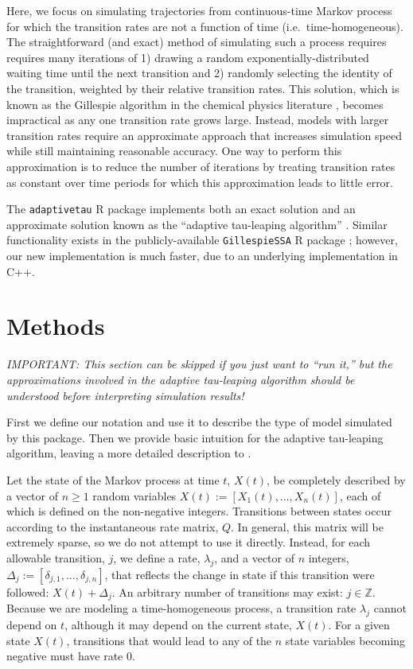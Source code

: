 \documentclass[11pt,nogin]{article}
\begin{document}
Here, we focus on simulating trajectories from continuous-time Markov process for which the transition rates are not a function of time (i.e.\ time-homogeneous).  The straightforward (and exact) method of simulating such a process requires requires many iterations of 1) drawing a random ex\-po\-nen\-tial\-ly-dis\-tri\-buted waiting time until the next transition and 2) randomly selecting the identity of the transition, weighted by their relative transition rates.  This solution, which is known as the Gillespie algorithm in the chemical physics literature \citep{Gil76}, becomes impractical as any one transition rate grows large.  Instead, models
with larger transition rates require an approximate approach that increases simulation speed while still maintaining reasonable accuracy.  One way to perform this approximation is to reduce the number of iterations by treating transition rates as constant over time periods for which this approximation leads to little error.

The \texttt{adaptivetau} R package implements both an exact solution and an approximate solution known as the ``adaptive tau-leaping algorithm'' \citet{CGP07}.  Similar functionality exists in the publicly-available \texttt{GillespieSSA} R package \citep{Pin08}; however, our new implementation is much faster, due to an underlying implementation in C++.


\section*{Methods}

\emph{IMPORTANT: This section can be skipped if you just want to ``run it,'' but the approximations involved in the adaptive tau-leaping algorithm should be understood before interpreting simulation results!}

First we define our notation and use it to describe the type of model simulated by this package. Then we provide basic intuition for the adaptive tau-leaping algorithm, leaving a more detailed description to \citet{CGP07}.

Let the state of the Markov process at time $t$, $X(t)$, be completely described by a vector of $n\ge1$ random variables $X(t):=[X_{1}(t),\ldots,X_{n}(t)]$, each of which is defined on the non-negative integers. Transitions between states occur according to the instantaneous rate matrix, $Q$. In general, this matrix will be extremely sparse, so we do not attempt to use it directly. Instead, for each allowable transition, $j$, we define a rate, $\lambda_{j}$, and a vector of $n$ integers, $\Delta_{j}:=[\delta_{j,1},\ldots,\delta_{j,n}]$, that reflects the change in state if this transition were followed: $X(t)+\Delta_{j}$. An arbitrary number of transitions may exist: $j\in\mathbb{Z}$. Because we are modeling a time-homogeneous process, a transition rate $\lambda_{j}$ cannot depend on $t$, although it may depend on the current state, $X(t)$. For a given state $X(t)$, transitions that would lead to any of the $n$ state variables becoming negative must have rate 0.
\end{document}

